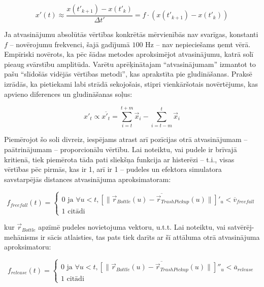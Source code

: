 \documentclass[12pt, a4paper]{article}
\numberwithin{equation}{section} %
\begin{document}
\begin{equation}
    x'(t) \approx \frac{x(t'_{k+1}) - x(t'_{k})}{\Delta t'} = f \cdot \left (x(t'_{k+1}) - x(t'_{k}) \right )
\end{equation}

Ja atvasinājumu absolūtās vērtības konkrētās mērvienībās nav svarīgas, konstanti $f$ -- novērojumu frekvenci, šajā gadījumā $100$ Hz -- nav nepieciešams ņemt vērā. Empīriski novērots, ka pēc šādas metodes aproksimējot atvasinājumu, katrā solī pieaug svārstību amplitūda. Varētu aprēķinātajam ``atvasinājumam'' izmantot to pašu ``slīdošās vidējās vērtības metodi'', kas aprakstīta pie gludināšanas. Praksē izrādās, ka pietiekami labi strādā sekojošais, stipri vienkāršotais novērtējums, kas apvieno diferences un gludināšanas soļus:

\begin{equation}
    x'_t \propto \overline{x'_t} = \sum_{i=t}^{t+m} \vec{x}_i - \sum_{i=t-m}^{t} \vec{x}_i
\end{equation}

Piemērojot šo soli divreiz, iespējams atrast arī pozīcijas otrā atvasinājumam -- paātrinājumam -- proporcionālu vērtību. Lai noteiktu, vai pudele ir brīvajā kritienā, tiek piemērota tāda pati sliekšņa funkcija ar histerēzi -- t.i., visas vērtības pēc pirmās, kas ir 1, arī ir 1 -- pudeles un efektora simulatora savstarpējās distances atvasinājuma aproksimatoram:


\begin{equation}
    f_{freefall} (t) = \begin{cases}
        0 \text{ ja } \forall u < t,  \overline{ \left [ \lVert \vec{r}_{Bottle}(u) - \vec{r}_{TrashPickup}(u)  \rVert \right ] '_u} < \overline{v}_{freefall} \\
        1 \text{ citādi }
    \end{cases}
\end{equation}

kur $\vec{r}_{Bottle}$ apzīmē pudeles novietojuma vektoru, u.t.t. Lai noteiktu, vai satvērēj-mehānisms ir sācis atlaisties, tas pats tiek darīts ar šī attāluma otrā atvasinājuma aproksimatoru:


\begin{equation}
    f_{release} (t) = \begin{cases}
        0 \text{ ja } \forall u < t, \overline{ \left [ \lVert \vec{r}_{Bottle}(u) - \vec{r}_{TrashPickup}(u)  \rVert \right ] ''_u} < \overline{a}_{release} \\
        1 \text{ citādi }
    \end{cases}
\end{equation}
\end{document}
